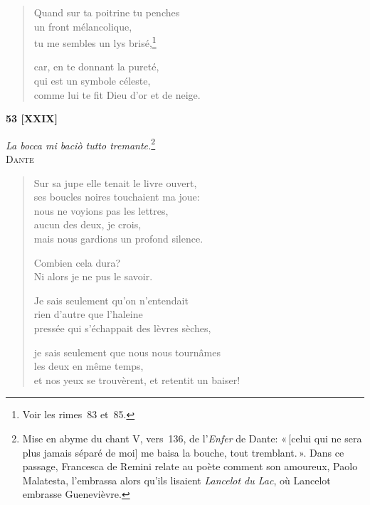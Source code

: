 \begin{verse}
  Quand sur ta poitrine tu penches \\
  un front mélancolique, \\
  tu me sembles
  un lys brisé,\footnote{Voir les rimes~83 et~85.}

  car, en te donnant la pureté, \\
  qui est un symbole céleste, \\
  comme lui te fit Dieu
  d'or et de neige.
\end{verse}


\begin{center}
  \textbf{53 [XXIX]}
\end{center}

\begin{flushright}
  \emph{La bocca mi baciò tutto tremante.}\footnote{Mise en abyme du
  chant V, vers~136, de l'\emph{Enfer} de Dante: «\,[celui qui ne sera
  plus jamais séparé de moi] me baisa la bouche, tout
  tremblant.\,». Dans ce passage, Francesca de Remini relate au poète
  comment son amoureux, Paolo Malatesta, l'embrassa alors qu'ils
  lisaient \emph{Lancelot du Lac}, où Lancelot embrasse Guenevièvre.} \\
  \textsc{Dante}
\end{flushright}

\begin{verse}
  Sur sa jupe elle tenait
  le livre ouvert, \\
  ses boucles noires
  touchaient ma joue:\\
  nous ne voyions pas les lettres, \\
  aucun des deux, je crois, \\
  mais nous gardions
  un profond silence.

  Combien cela dura? \\
  Ni alors je ne pus le savoir.

  Je sais seulement qu'on n'entendait \\
  rien d'autre que l'haleine \\
  pressée qui s'échappait des lèvres sèches,

  je sais seulement que nous nous tournâmes \\
  les deux en même temps, \\
  et nos yeux se trouvèrent,
  et retentit un baiser!
\end{verse}

